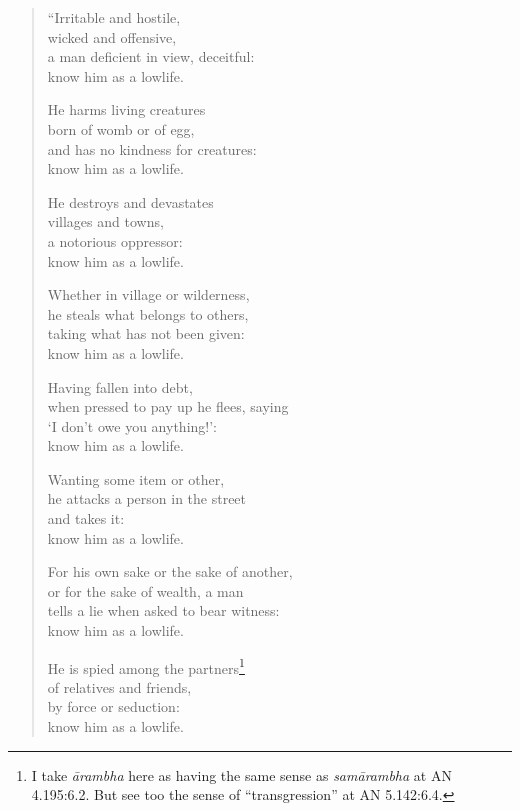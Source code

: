 \documentclass[12pt,openany]{book}%
\begin{document}
\begin{verse}%
“Irritable and hostile, \\
wicked and offensive, \\
a man deficient in view, deceitful: \\
know him as a lowlife. 

He harms living creatures \\
born of womb or of egg, \\
and has no kindness for creatures: \\
know him as a lowlife. 

He destroys and devastates \\
villages and towns, \\
a notorious oppressor: \\
know him as a lowlife. 

Whether in village or wilderness, \\
he steals what belongs to others, \\
taking what has not been given: \\
know him as a lowlife. 

Having fallen into debt, \\
when pressed to pay up he flees, saying \\
‘I don’t owe you anything!’: \\
know him as a lowlife. 

Wanting some item or other, \\
he attacks a person in the street \\
and takes it: \\
know him as a lowlife. 

For his own sake or the sake of another, \\
or for the sake of wealth, a man \\
tells a lie when asked to bear witness: \\
know him as a lowlife. 

He is spied among the partners\footnote{I take \textit{\textsanskrit{ārambha}} here as having the same sense as \textit{\textsanskrit{samārambha}} at AN 4.195:6.2. But see too the sense of “transgression” at AN 5.142:6.4. } \\
of relatives and friends, \\
by force or seduction: \\
know him as a lowlife. 


\end{verse}
\end{document}
